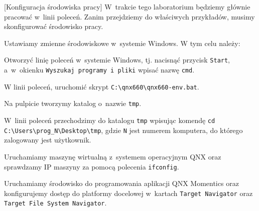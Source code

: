 \begin{example}{[Konfiguracja środowiska pracy]}
W~trakcie tego laboratorium będziemy głównie pracować w~linii poleceń. Zanim przejdziemy do właściwych przykładów, musimy skonfigurować środowisko pracy.

\begin{myenumerate}
\item  Ustawiamy zmienne środowiskowe w~systemie Windows. W tym celu należy:
\begin{myitemize}
\item Otworzyć linię poleceń w~systemie Windows, tj. nacisnąć przycisk \lstinline[style=MyBashStyle]{Start}, a~w~okienku \lstinline[style=MyBashStyle]{Wyszukaj programy i pliki} wpisać nazwę \lstinline[style=MyBashStyle]{cmd}.
\item W linii poleceń, uruchomić skrypt \lstinline[style=MyBashStyle]{C:\qnx660\qnx660-env.bat}.
\end{myitemize}

\item Na pulpicie tworzymy katalog o~nazwie \lstinline[style=MyBashStyle]{tmp}.
\item W~linii poleceń przechodzimy do katalogu \lstinline[style=MyBashStyle]{tmp} wpisując komendę \lstinline[style=MyBashStyle]{cd C:\Users\prog_N\Desktop\tmp}, gdzie \lstinline[style=MyBashStyle]{N} jest numerem komputera, do którego zalogowany jest użytkownik.
\item Uruchamiamy maszynę wirtualną z~systemem operacyjnym QNX oraz sprawdzamy IP maszyny za pomocą polecenia \lstinline[style=MyBashStyle]{ifconfig}.
\item Uruchamiamy środowisko do programowania aplikacji QNX Momentics oraz konfigurujemy dostęp do platformy docelowej w~kartach \lstinline[style=MyBashStyle]{Target Navigator} oraz \lstinline[style=MyBashStyle]{Target File System Navigator}.
\end{myenumerate}
\end{example}

